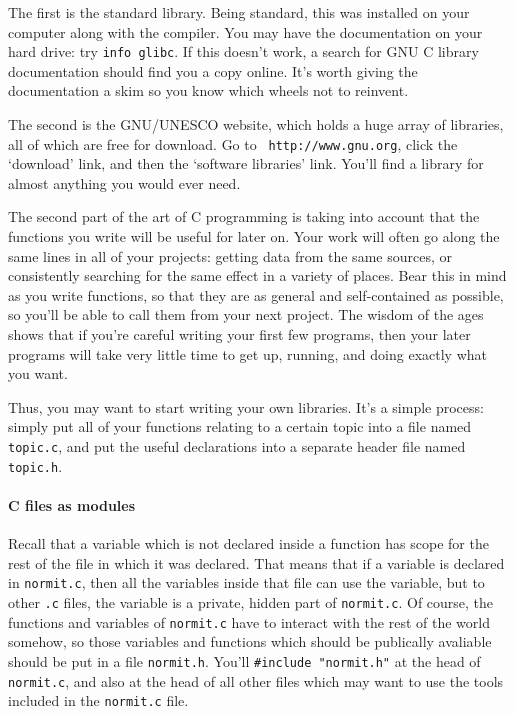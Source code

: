 \documentclass[12pt]{article}
\begin{document}
The first is the standard library. Being standard, this was
installed on your computer along with the compiler. You may have the
documentation on your hard drive: try {\tt info glibc}. If this doesn't
work, a search for GNU C library documentation should find you a copy
online. It's worth giving the documentation a skim so you know which wheels not to reinvent.

The second is the GNU/UNESCO website, which holds a huge array
of libraries, all of which are free for download. Go to {\tt
http://www.gnu.org}, click the `download' link, and then the `software
libraries' link. You'll find a library for almost anything you would
ever need.

The second part of the art of C programming is taking into account that
the functions you write will be useful for later on. Your work will often
go along the same lines in all of your projects: getting data from the
same sources, or consistently searching for the same effect in a
variety of places. Bear this in mind as you write functions, so that they
are as general and self-contained as possible, so you'll be able to call
them from your next project. The wisdom of the ages shows that if you're
careful writing your first few programs, then your later programs will
take very little time to get up, running, and doing exactly what you want.

Thus, you may want to start writing your own libraries. It's a simple
process: simply put all of your functions relating to a certain topic
into a file named {\tt topic.c}, and put the useful declarations into a separate header file named {\tt
topic.h}. 


\paragraph{C files as modules}
Recall that a variable which is not declared inside a function has scope for the rest of the file in
which it was declared. That means that if a variable is declared in {\tt normit.c}, then all the variables
inside that file can use the variable, but to other {\tt .c} files, the variable is
a private, hidden part of {\tt normit.c}. Of course, the functions and variables of {\tt normit.c} have
to interact with the rest of the world somehow, so those variables and functions which should be
publically avaliable should be put in a file {\tt normit.h}. You'll {\tt \#include "normit.h"} at the head
of {\tt normit.c}, and also at the head of all other files which may want to use the tools included in
the {\tt normit.c} file.
\end{document}
